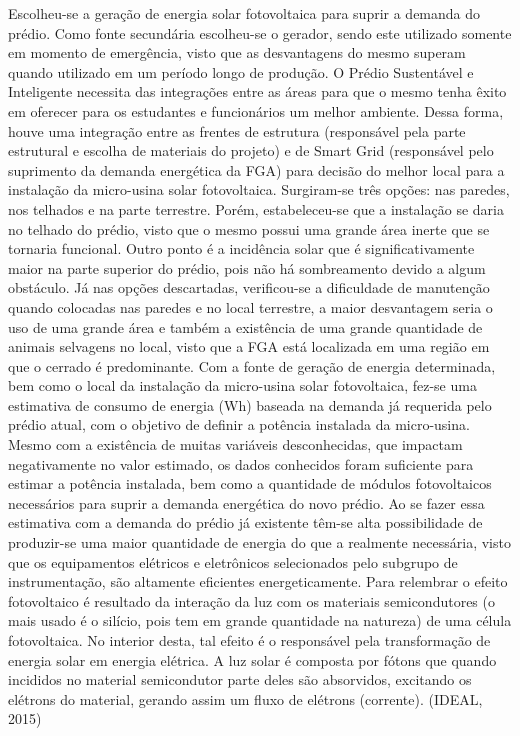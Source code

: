 Escolheu-se a geração de energia solar fotovoltaica para suprir a demanda do prédio. Como fonte secundária escolheu-se o gerador, sendo este utilizado somente em momento de emergência, visto que as desvantagens do mesmo superam quando utilizado em um período longo de produção.
O Prédio Sustentável e Inteligente necessita das integrações entre as áreas para que o mesmo tenha êxito em oferecer para os estudantes e funcionários um melhor ambiente. Dessa forma, houve uma integração entre as frentes de estrutura (responsável pela parte estrutural e escolha de materiais do projeto) e de Smart Grid (responsável pelo suprimento da demanda energética da FGA) para decisão do melhor local para a instalação da micro-usina solar fotovoltaica. Surgiram-se três opções: nas paredes, nos telhados e na parte terrestre. Porém, estabeleceu-se que a instalação se daria no telhado do prédio, visto que o mesmo possui uma grande área inerte que se tornaria funcional. Outro ponto é a incidência solar que é significativamente maior na parte superior do prédio, pois não há sombreamento devido a algum obstáculo. 
Já nas opções descartadas, verificou-se a dificuldade de manutenção quando colocadas nas paredes e no local terrestre, a maior desvantagem seria o uso de uma grande área e também a existência  de uma grande quantidade de animais selvagens no local, visto que a FGA está localizada em uma região em que o cerrado é predominante.
Com a fonte de geração de energia determinada, bem como o local da instalação da micro-usina solar fotovoltaica, fez-se uma estimativa de consumo de energia (Wh) baseada na demanda já requerida pelo prédio atual, com o  objetivo de definir a potência instalada da micro-usina. 
Mesmo com a existência de muitas variáveis desconhecidas, que impactam negativamente no valor estimado, os dados conhecidos foram suficiente para estimar a potência instalada, bem como a quantidade de módulos fotovoltaicos necessários para suprir a demanda energética do novo prédio. Ao se fazer essa estimativa com a demanda do prédio já existente têm-se  alta possibilidade de produzir-se uma maior quantidade de energia do que a realmente necessária, visto que os equipamentos elétricos e eletrônicos selecionados pelo subgrupo de instrumentação, são altamente eficientes energeticamente.
Para relembrar o efeito fotovoltaico é resultado da interação da luz com os materiais semicondutores (o mais usado é o silício, pois tem em grande quantidade na natureza) de uma célula fotovoltaica. No interior desta, tal efeito é o responsável pela transformação de energia solar em energia elétrica. A luz solar é composta por fótons que quando incididos no material semicondutor parte deles são absorvidos, excitando os elétrons do material, gerando assim um fluxo de elétrons (corrente). (IDEAL, 2015)
